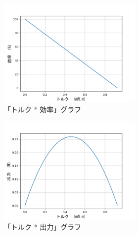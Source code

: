 \begin{figure}[t]
	\centering
	\includegraphics[width=7cm]{./Image/efficiency.png}
	\caption{「トルク * 効率」グラフ}
	\label{fig:effi}
\end{figure}
\begin{figure}[t]
	\centering
	\includegraphics[width=7cm]{./Image/output.png}
	\caption{「トルク * 出力」グラフ}
	\label{fig:output}
\end{figure}
